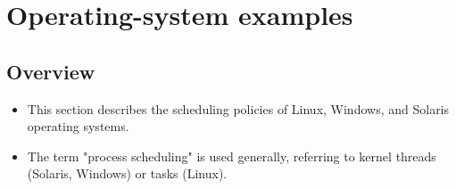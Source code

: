 \section{Operating-system examples}\label{sec:5.7}

\subsection{Overview}
\begin{itemize}
    \item This section describes the scheduling policies of Linux, Windows, and Solaris operating systems.
    \item The term "process scheduling" is used generally, referring to kernel threads (Solaris, Windows) or tasks (Linux).
\end{itemize}

